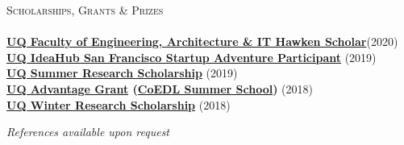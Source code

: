 \documentclass[a4paper]{article}
\newcommand{\lineunder} {
    \vspace*{-8pt} \\
    \hspace*{-10pt} \hrulefill \\
}
\newcommand{\header} [1] {
    {\hspace*{-10pt}\vspace*{6pt} \textsc{#1}}
    \vspace*{-6pt} \lineunder
}
\begin{document}
\header{Scholarships, Grants \& Prizes}
\textbf{\href{https://www.eait.uq.edu.au/eait-scholars-program}{UQ Faculty of Engineering, Architecture \& IT Hawken Scholar}}\hfill (2020)\\
\textbf{\href{https://ventures.uq.edu.au/san-fran}{UQ IdeaHub San Francisco Startup Adventure Participant}} \hfill (2019)\\
\textbf{\href{https://employability.uq.edu.au/summer-winter-research}{UQ Summer Research Scholarship}} \hfill (2019)\\
\textbf{\href{https://employability.uq.edu.au/financial-support/employability-grant}{UQ Advantage Grant} (\href{http://www.dynamicsoflanguage.edu.au/education-and-outreach/train-with-us/summer-school-2018/}{CoEDL Summer School})} \hfill (2018)\\
\textbf{\href{https://employability.uq.edu.au/summer-winter-research}{UQ Winter Research Scholarship}} \hfill (2018)\\


\vspace{1.5mm}
\begin{center}
\small \textit{References available upon request}
\end{center}
\end{document}
